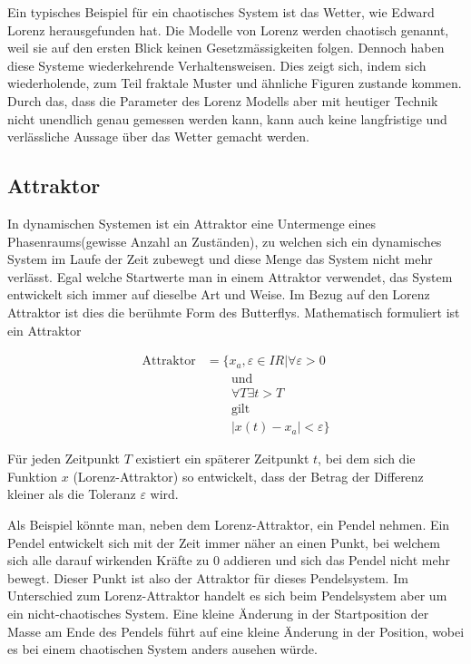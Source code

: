 Ein typisches Beispiel für ein chaotisches System ist das Wetter, wie Edward Lorenz herausgefunden hat. Die Modelle von Lorenz werden chaotisch genannt, weil sie auf den ersten Blick keinen Gesetzmässigkeiten folgen. Dennoch haben diese Systeme wiederkehrende Verhaltensweisen. Dies zeigt sich, indem sich wiederholende, zum Teil fraktale Muster und ähnliche Figuren zustande kommen. Durch das, dass die Parameter des Lorenz Modells aber mit heutiger Technik nicht unendlich genau gemessen werden kann, kann auch keine langfristige und verlässliche Aussage über das Wetter gemacht werden. 

\subsection{Attraktor}
In dynamischen Systemen ist ein Attraktor eine Untermenge eines Phasenraums(gewisse Anzahl an Zuständen), zu welchen sich ein dynamisches System im Laufe der Zeit zubewegt und diese Menge das System nicht mehr verlässt. \cite{wikiattraktor}
 Egal welche Startwerte man in einem Attraktor verwendet, das System entwickelt sich immer auf dieselbe Art und Weise. Im Bezug auf den Lorenz Attraktor ist dies die berühmte Form des Butterflys. Mathematisch formuliert ist ein Attraktor 


\begin{align}
\label{Attraktor} \text{Attraktor} &= \{ x_a,\varepsilon \in I\!R| \forall \varepsilon > 0 \nonumber\\
&\qquad {} \text{und} \nonumber\\
&\qquad {}  \forall T \exists t > T  \nonumber\\
&\qquad {}\text{gilt} \nonumber\\
&\qquad {} | x(t) - x_a | < \varepsilon \} 
\end{align}

Für jeden Zeitpunkt $T$ existiert ein späterer Zeitpunkt $t$, bei dem sich die Funktion $x$ (Lorenz-Attraktor) so entwickelt, dass der Betrag der Differenz kleiner als die Toleranz $\varepsilon$ wird. 

Als Beispiel könnte man, neben dem Lorenz-Attraktor, ein Pendel nehmen. Ein Pendel entwickelt sich mit der Zeit immer näher an einen Punkt, bei welchem sich alle darauf wirkenden Kräfte zu 0 addieren und sich das Pendel nicht mehr bewegt. Dieser Punkt ist also der Attraktor für dieses Pendelsystem. Im Unterschied zum Lorenz-Attraktor handelt es sich beim Pendelsystem aber um ein nicht-chaotisches System. Eine kleine Änderung in der Startposition der Masse am Ende des Pendels führt auf eine kleine Änderung in der Position, wobei es bei einem chaotischen System anders ausehen würde. 

